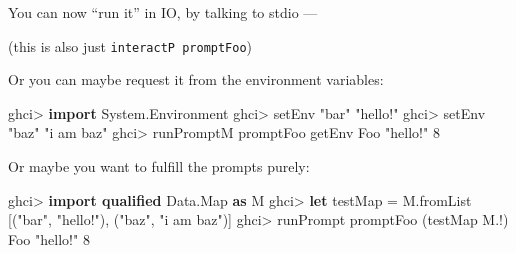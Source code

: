 \documentclass[]{article}
\newenvironment{Shaded}{}{}
\newcommand{\KeywordTok}[1]{\textcolor[rgb]{0.00,0.44,0.13}{\textbf{{#1}}}}
\newcommand{\DataTypeTok}[1]{\textcolor[rgb]{0.56,0.13,0.00}{{#1}}}
\newcommand{\DecValTok}[1]{\textcolor[rgb]{0.25,0.63,0.44}{{#1}}}
\newcommand{\StringTok}[1]{\textcolor[rgb]{0.25,0.44,0.63}{{#1}}}
\newcommand{\CommentTok}[1]{\textcolor[rgb]{0.38,0.63,0.69}{\textit{{#1}}}}
\newcommand{\OtherTok}[1]{\textcolor[rgb]{0.00,0.44,0.13}{{#1}}}
\newcommand{\FunctionTok}[1]{\textcolor[rgb]{0.02,0.16,0.49}{{#1}}}
\newcommand{\NormalTok}[1]{{#1}}
\begin{document}
You can now ``run it'' in IO, by talking to stdio ---

\begin{Shaded}
\end{Shaded}

(this is also just \texttt{interactP\ promptFoo})

Or you can maybe request it from the environment variables:

\begin{Shaded}
\begin{Highlighting}[]
\NormalTok{ghci}\FunctionTok{>} \KeywordTok{import }\DataTypeTok{System.Environment}
\NormalTok{ghci}\FunctionTok{>} \NormalTok{setEnv }\StringTok{"bar"} \StringTok{"hello!"}
\NormalTok{ghci}\FunctionTok{>} \NormalTok{setEnv }\StringTok{"baz"} \StringTok{"i am baz"}
\NormalTok{ghci}\FunctionTok{>} \NormalTok{runPromptM promptFoo getEnv}
\DataTypeTok{Foo} \StringTok{"hello!"} \DecValTok{8}
\end{Highlighting}
\end{Shaded}

Or maybe you want to fulfill the prompts purely:

\begin{Shaded}
\begin{Highlighting}[]
\NormalTok{ghci}\FunctionTok{>} \KeywordTok{import qualified} \DataTypeTok{Data.Map} \KeywordTok{as} \DataTypeTok{M}
\NormalTok{ghci}\FunctionTok{>} \KeywordTok{let} \NormalTok{testMap }\FunctionTok{=} \NormalTok{M.fromList [(}\StringTok{"bar"}\NormalTok{, }\StringTok{"hello!"}\NormalTok{), (}\StringTok{"baz"}\NormalTok{, }\StringTok{"i am baz"}\NormalTok{)]}
\NormalTok{ghci}\FunctionTok{>} \NormalTok{runPrompt promptFoo (testMap }\FunctionTok{M.!}\NormalTok{)}
\DataTypeTok{Foo} \StringTok{"hello!"} \DecValTok{8}
\end{Highlighting}
\end{Shaded}
\end{document}
